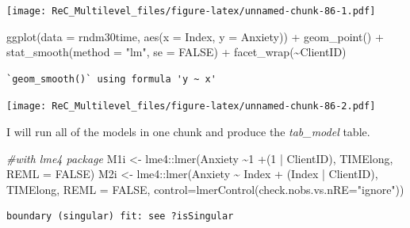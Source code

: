 \documentclass[
  11pt,
]{book}
\newenvironment{Shaded}{\begin{snugshade}}{\end{snugshade}}
\newcommand{\AttributeTok}[1]{\textcolor[rgb]{0.77,0.63,0.00}{#1}}
\newcommand{\CommentTok}[1]{\textcolor[rgb]{0.56,0.35,0.01}{\textit{#1}}}
\newcommand{\ConstantTok}[1]{\textcolor[rgb]{0.00,0.00,0.00}{#1}}
\newcommand{\DecValTok}[1]{\textcolor[rgb]{0.00,0.00,0.81}{#1}}
\newcommand{\FunctionTok}[1]{\textcolor[rgb]{0.00,0.00,0.00}{#1}}
\newcommand{\NormalTok}[1]{#1}
\newcommand{\OtherTok}[1]{\textcolor[rgb]{0.56,0.35,0.01}{#1}}
\newcommand{\SpecialCharTok}[1]{\textcolor[rgb]{0.00,0.00,0.00}{#1}}
\newcommand{\StringTok}[1]{\textcolor[rgb]{0.31,0.60,0.02}{#1}}
\begin{document}
\texttt{[image: ReC\_Multilevel\_files/figure-latex/unnamed-chunk-86-1.pdf]}

\begin{Shaded}
\begin{Highlighting}[]
\FunctionTok{ggplot}\NormalTok{(}\AttributeTok{data =}\NormalTok{ rndm30time, }\FunctionTok{aes}\NormalTok{(}\AttributeTok{x =}\NormalTok{ Index, }\AttributeTok{y =}\NormalTok{ Anxiety)) }\SpecialCharTok{+} \FunctionTok{geom\_point}\NormalTok{() }\SpecialCharTok{+}
    \FunctionTok{stat\_smooth}\NormalTok{(}\AttributeTok{method =} \StringTok{"lm"}\NormalTok{, }\AttributeTok{se =} \ConstantTok{FALSE}\NormalTok{) }\SpecialCharTok{+} \FunctionTok{facet\_wrap}\NormalTok{(}\SpecialCharTok{\textasciitilde{}}\NormalTok{ClientID)}
\end{Highlighting}
\end{Shaded}

\begin{verbatim}
`geom_smooth()` using formula 'y ~ x'
\end{verbatim}

\texttt{[image: ReC\_Multilevel\_files/figure-latex/unnamed-chunk-86-2.pdf]}

I will run all of the models in one chunk and produce the \emph{tab\_model} table.

\begin{Shaded}
\begin{Highlighting}[]
\CommentTok{\#with lme4 package}
\NormalTok{M1i }\OtherTok{\textless{}{-}}\NormalTok{ lme4}\SpecialCharTok{::}\FunctionTok{lmer}\NormalTok{(Anxiety }\SpecialCharTok{\textasciitilde{}}\DecValTok{1} \SpecialCharTok{+}\NormalTok{(}\DecValTok{1} \SpecialCharTok{|}\NormalTok{ ClientID), TIMElong, }\AttributeTok{REML =} \ConstantTok{FALSE}\NormalTok{)}
\NormalTok{M2i }\OtherTok{\textless{}{-}}\NormalTok{ lme4}\SpecialCharTok{::}\FunctionTok{lmer}\NormalTok{(Anxiety }\SpecialCharTok{\textasciitilde{}}\NormalTok{ Index }\SpecialCharTok{+}\NormalTok{ (Index }\SpecialCharTok{|}\NormalTok{ ClientID), TIMElong, }\AttributeTok{REML =} \ConstantTok{FALSE}\NormalTok{, }\AttributeTok{control=}\FunctionTok{lmerControl}\NormalTok{(}\AttributeTok{check.nobs.vs.nRE=}\StringTok{"ignore"}\NormalTok{))}
\end{Highlighting}
\end{Shaded}

\begin{verbatim}
boundary (singular) fit: see ?isSingular
\end{verbatim}
\end{document}
